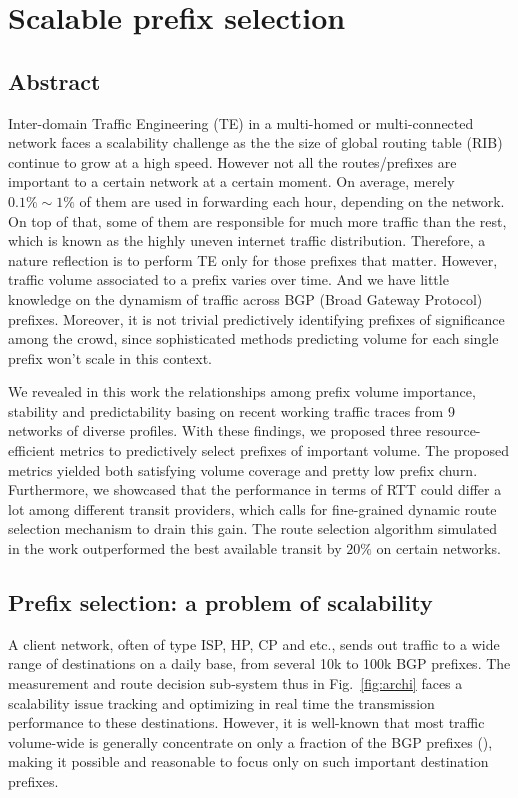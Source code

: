 \chapter{Scalable prefix selection}
\label{sec:pref_selec}

\section*{Abstract}
Inter-domain Traffic Engineering (TE) in a multi-homed or multi-connected network faces a scalability challenge as the the size of global routing table (RIB) continue to grow at a high speed. However not all the routes/prefixes are important to a certain network at a certain moment. On average, merely $0.1\% \sim 1\%$ of them are used in forwarding each hour, depending on the network. On top of that, some of them are responsible for much more traffic than the rest, which is known as the highly uneven internet traffic distribution.
Therefore, a nature reflection is to perform TE only for those prefixes that matter.
However, traffic volume associated to a prefix varies over time. And we have little knowledge on the dynamism of traffic across BGP (Broad Gateway Protocol) prefixes. 
Moreover, it is not trivial predictively identifying prefixes of significance among the crowd, since sophisticated methods predicting volume for each single prefix won't scale in this context.

We revealed in this work the relationships among prefix volume importance, stability and predictability basing on recent working traffic traces from 9 networks of diverse profiles. 
With these findings, we proposed three resource-efficient metrics to predictively select prefixes of important volume. The proposed metrics yielded both satisfying volume coverage and pretty low prefix churn. Furthermore, we showcased that the performance in terms of RTT could differ a lot among different transit providers, which calls for fine-grained dynamic route selection mechanism to drain this gain. The route selection algorithm simulated in the work outperformed the best available transit by $20\%$ on certain networks. 
\clearpage

\section{Prefix selection: a problem of scalability}
A client network, often of type \acf{ISP}, \acf{HP}, \acf{CP} and etc., sends out traffic to a wide range of destinations on a daily base, from several 10k to 100k BGP prefixes.
The measurement and route decision sub-system thus in Fig.~\ref{fig:archi} faces a scalability issue tracking and optimizing in real time the transmission performance to these destinations.
However, it is well-known that most traffic volume-wide is generally concentrate on only a fraction of the BGP prefixes (\cite{Fang1999, Feamster2003, Papagiannaki2005, Sarrar2012}), 
making it possible and reasonable to focus only on such important destination prefixes. 

